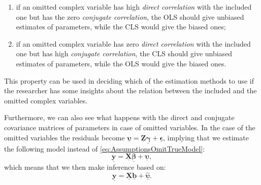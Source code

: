 \documentclass[
]{book}
\providecommand{\tightlist}{%
  \setlength{\itemsep}{0pt}\setlength{\parskip}{0pt}}
\begin{document}
\begin{enumerate}
\def\labelenumi{\arabic{enumi}.}
\tightlist
\item
  if an omitted complex variable has high \emph{direct correlation} with the included one but has the zero \emph{conjugate correlation}, the OLS should give unbiased estimates of parameters, while the CLS would give the biased ones;
\item
  if an omitted complex variable has zero \emph{direct correlation} with the included one but has high \emph{conjugate correlation}, the CLS should give unbiased estimates of parameters, while the OLS would give the biased ones.
\end{enumerate}

This property can be used in deciding which of the estimation methods to use if the researcher has some insights about the relation between the included and the omitted complex variables.

Furthermore, we can also see what happens with the direct and conjugate covariance matrices of parameters in case of omitted variables. In the case of the omitted variables the residuals become \(\underline{\boldsymbol{\upsilon}} = \underline{\mathbf{Z}} \underline{\boldsymbol{\gamma}} + \underline{\boldsymbol{\epsilon}}\), implying that we estimate the following model instead of \eqref{eq:AssumptionsOmitTrueModel}:
\begin{equation}
    \underline{\mathbf{y}} = \underline{\mathbf{X}} \underline{\boldsymbol{\beta}} + \underline{\boldsymbol{\upsilon}} ,
    \label{eq:AssumptionsOmitAppliedTrueModel}
\end{equation}
which means that we then make inference based on:
\begin{equation}
    \underline{\mathbf{y}} = \underline{\mathbf{X}} \underline{\boldsymbol{b}} + \hat{\underline{\boldsymbol{\upsilon}}} .
    \label{eq:AssumptionsOmitAppliedModel}
\end{equation}
\end{document}

